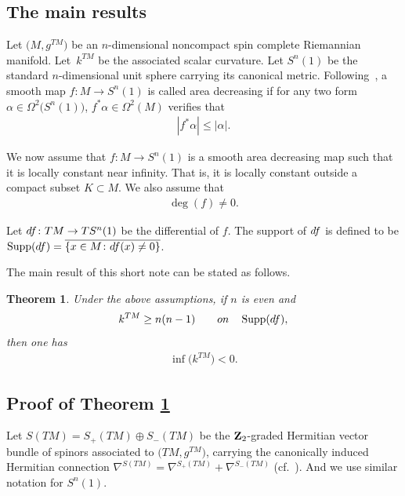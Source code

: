\documentclass[11pt]{article}
\numberwithin{equation}{section}
\numberwithin{equation}{section}
\newtheorem{thm}{Theorem}[section]
\theoremstyle{definition}
\begin{document}
\subsection{The main results}\label{s1.1}

Let $\big(M,g^{TM}\big)$ be an $n$-dimensional noncompact spin complete Riemannian manifold. Let~$k^{TM}$ be the associated scalar curvature. Let $S^n(1)$ be the standard $n$-dimensional unit sphere carrying its canonical metric. Following~\cite{GL83}, a smooth map $f\colon M \rightarrow S^n(1)$ is called area decreasing if for any two form $\alpha\in\Omega^2\big(S^n(1)\big)$, $f^*\alpha\in\Omega^2(M)$ verifies that
\begin{gather}\label{1.1}
|f^*\alpha|\leq |\alpha|.
\end{gather}

We now assume that $f\colon M\rightarrow S^n(1)$ is a smooth area decreasing map such that it is locally constant near infinity. That is, it is locally constant outside a compact subset $K\subset M$. We also assume that
\begin{gather}\label{1.2}
\deg (f)\neq 0.
\end{gather}

Let ${\rm d}f\colon TM\rightarrow TS^n(1)$ be the differential of $f$. The support of ${\rm d}f$ is defined to be $\operatorname{Supp}({\rm d}f)=\overline{\{ x\in M\colon {\rm d}f(x)\neq 0\}}$.

The main result of this short note can be stated as follows.

\begin{thm}\label{t1.1} Under the above assumptions, if $n$ is even and
\begin{gather}\label{1.3}
k^{TM}\geq n(n-1) \qquad {\rm on}\quad \operatorname{Supp}({\rm d}f),
\end{gather}
then one has
\begin{gather}\label{1.4}
\inf \big(k^{TM}\big)<0.
\end{gather}
\end{thm}


\subsection{Proof of Theorem \ref{t1.1}}\label{s1.2}

Let $S(TM)=S_+(TM)\oplus S_-(TM)$ be the ${\bf Z}_2$-graded Hermitian vector bundle of spinors associated to $\big(TM,g^{TM}\big)$, carrying the canonically induced Hermitian connection $\nabla^{S(TM)}=\nabla^{S_+(TM)}+\nabla^{S_-(TM)}$ (cf.~\cite{LaMi89}). And we use similar notation for $ S^n(1)$.
\end{document}
